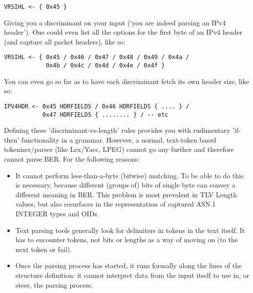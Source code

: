 \begin{changemargin}{-60mm}{0mm}
\begin{myquote}
\begin{verbatim}
VRSIHL <- { 0x45 }
\end{verbatim}
\end{myquote}
\end{changemargin}

Giving you a discriminant on your input (‘you are indeed parsing an IPv4 
header’). One could even list all the options for the first byte of an 
IPv4 header (and capture all packet headers), like so:

\begin{changemargin}{-60mm}{0mm}
\begin{myquote}
\begin{verbatim}
VRSIHL <- { 0x45 / 0x46 / 0x47 / 0x48 / 0x49 / 0x4a /
            0x4b / 0x4c / 0x4d / 0x4e / 0x4f }
\end{verbatim}
\end{myquote}
\end{changemargin}

You can even go so far as to have each discriminant fetch its own header 
size, like so:

\begin{changemargin}{-60mm}{0mm}
\begin{myquote}
\begin{verbatim}
IPV4HDR <- 0x45 HDRFIELDS / 0x46 HDRFIELDS { .... } /
           0x47 HDRFIELDS { ........ } / -- etc
\end{verbatim}
\end{myquote}
\end{changemargin}

Defining these 'discriminant-vs-length' rules provides you with
rudimentary 'if-then' functionality in a grammar.
However, a normal, text-token based tokenizer/parser (like Lex/Yacc, LPEG) 
cannot go any further and therefore cannot parse BER. For the following 
reasons:

\begin{itemize}
    \item It cannot perform less-than-a-byte (bitwise) matching. To be able 
to do this is necessary, because different (groups of) bits of single byte 
can convey a different meaning in BER. This problem is most prevalent in 
TLV Length values, but also resurfaces in the representation of captured 
ASN.1 INTEGER types and OIDs.
    \item Text parsing tools generally look for delimiters in tokens in the 
text itself. It has to encounter tokens, not bits or lengths as a way of 
moving on (to the next token or fail).
    \item Once the parsing process has started, it runs formally along the 
lines of the structure definition: it cannot interpret data from the input 
itself to use in, or steer, the parsing process. 
\end{itemize}

